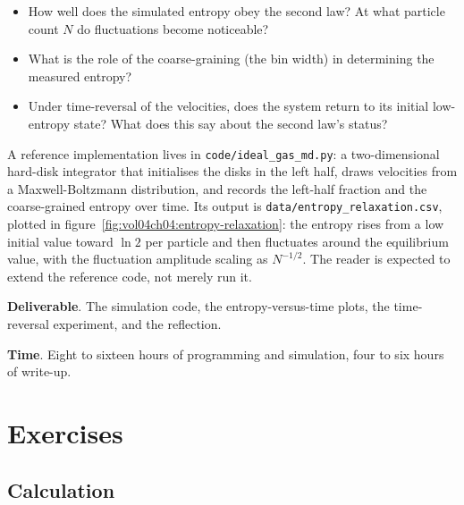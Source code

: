 \begin{project}
\begin{itemize}[leftmargin=*]
  \item How well does the simulated entropy obey the second law? At
    what particle count $N$ do fluctuations become noticeable?
  \item What is the role of the coarse-graining (the bin width) in
    determining the measured entropy?
  \item Under time-reversal of the velocities, does the system
    return to its initial low-entropy state? What does this say
    about the second law's status?
\end{itemize}

A reference implementation lives in \texttt{code/ideal\_gas\_md.py}: a
two-dimensional hard-disk integrator that initialises the disks in the
left half, draws velocities from a Maxwell-Boltzmann distribution, and
records the left-half fraction and the coarse-grained entropy over time.
Its output is \texttt{data/entropy\_relaxation.csv}, plotted in
figure~\ref{fig:vol04ch04:entropy-relaxation}: the entropy rises from a
low initial value toward $\ln 2$ per particle and then fluctuates around
the equilibrium value, with the fluctuation amplitude scaling as
$N^{-1/2}$. The reader is expected to extend the reference code, not
merely run it.



\textbf{Deliverable}. The simulation code, the entropy-versus-time
plots, the time-reversal experiment, and the reflection.

\textbf{Time}. Eight to sixteen hours of programming and simulation,
four to six hours of write-up.
\end{project}

\section{Exercises}

\subsection*{Calculation}

